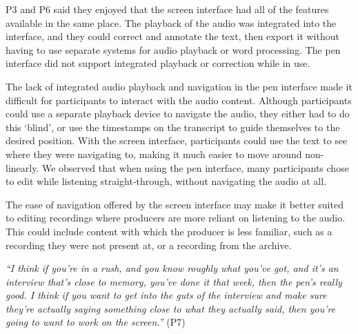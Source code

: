 P3 and P6 said they enjoyed that the screen interface had all of the features available in the same place. The playback
of the audio was integrated into the interface, and they could correct and annotate the text, then export it without
having to use separate systems for audio playback or word processing. The pen interface did not support integrated
playback or correction while in use.

The lack of integrated audio playback and navigation in the pen interface made it difficult for participants to
interact with the audio content.  Although participants could use a separate playback device to navigate the audio,
they either had to do this `blind', or use the timestamps on the transcript to guide themselves to the desired
position. With the screen interface, participants could use the text to see where they were navigating to, making it
much easier to move around non-linearly.  We observed that when using the pen interface, many participants chose to
edit while listening straight-through, without navigating the audio at all.

The ease of navigation offered by the screen interface may make it better suited to editing recordings where producers
are more reliant on listening to the audio. This could include content with which the producer is less familiar, such
as a recording they were not present at, or a recording from the archive.

\textit{``I think if you're in a rush, and you know roughly what you've got, and it's an interview that's close to
memory, you've done it that week, then the pen's really good. I think if you want to get into the guts of the interview
and make sure they're actually saying something close to what they actually said, then you're going to want to work on
the screen.''} (P7)




